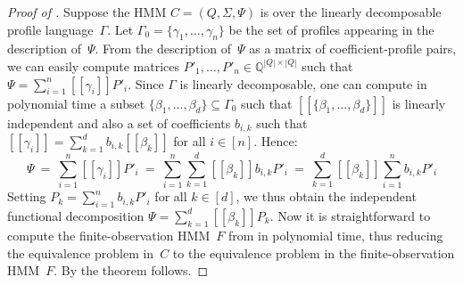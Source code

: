 \documentclass[a4paper,UKenglish,cleveref, autoref,mathscr]{lipics-v2019}
\newcommand{\QQ}{\mathbb{Q}}
\newcommand{\1}{\mathbbm{1}}
\begin{document}
\begin{proof}[Proof of ]
Suppose the HMM $C=(Q, \Sigma, \Psi)$ is over the linearly decomposable profile language~$\Gamma$.
Let $\Gamma_0 = \{\gamma_1, \ldots, \gamma_n\}$ be the set of profiles appearing in the description of~$\Psi$.
From the description of~$\Psi$ as a matrix of coefficient-profile pairs, we can easily compute matrices $P'_1, \dots, P'_n \in \QQ^{|Q| \times |Q|}$ such that $\Psi = \sum_{i=1}^n [\![\gamma_i]\!] P'_i$.
Since $\Gamma$ is linearly decomposable, one can compute in polynomial time a subset $\{\beta_1, \dots, \beta_d\} \subseteq \Gamma_0$ such that $[\![\{\beta_1, \dots, \beta_d\}]\!]$ is linearly independent and also a set of coefficients $b_{i,k}$ such that $[\![\gamma_i]\!] = \sum_{k = 1}^d b_{i,k} [\![\beta_k]\!]$ for all $i \in [n]$.
Hence:
\[
\Psi
\ = \ \sum_{i=1}^n [\![\gamma_i]\!] P'_i
\ = \ \sum_{i=1}^n \sum_{k=1}^d [\![\beta_k]\!] b_{i,k} P'_i
\ = \ \sum_{k=1}^d [\![\beta_k]\!] \sum_{i=1}^n b_{i,k} P'_i
\]
Setting $P_k = \sum_{i=1}^n b_{i,k} P'_i$ for all $k \in [d]$, we thus obtain the independent functional decomposition $\Psi = \sum_{k=1}^d [\![\beta_k]\!] P_k$.
Now it is straightforward to compute the finite-observation HMM~$F$ from  in polynomial time, thus reducing the equivalence problem in~$C$ to the equivalence problem in the finite-observation HMM~$F$.
By  the theorem follows.
\end{proof}
\end{document}
